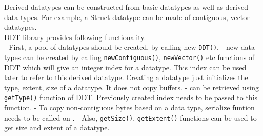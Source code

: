 Derived datatypes can be constructed from basic datatypes as well as derived 
data types. For example, a Struct datatype can be made of contiguous, vector datatypes.\\
\vspace*{0.1in}
DDT library provides following functionality.\\
- First, a pool of datatypes should be created, by calling new {\tt DDT()}.
\newline
- new data types can be created by calling {\tt newContiguous()}, {\tt newVector()} etc 
functions of DDT which will give an integer index for a datatype. This index 
can be used later to refer to this derived datatype. Creating a datatype just 
initializes the type, extent, size of a datatype. It does not copy buffers.
\newline
-  can be retrieved using {\tt getType()} function of DDT. Previously
created index needs to be passed to this function.
\newline
- To copy non-contiguous bytes based on a data type, serialize funtion needs to
be called on . 
\newline
- Also, {\tt getSize()}, {\tt getExtent()} functions can be used to get size and extent of a
datatype.

